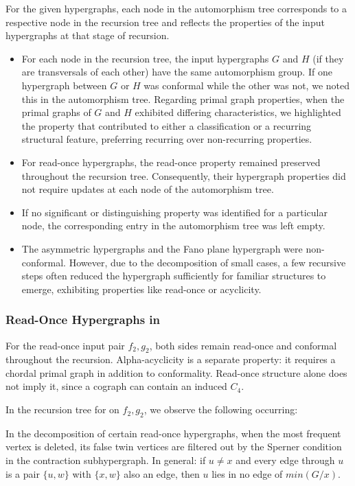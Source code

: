 For the given hypergraphs, each node in the automorphism tree corresponds to a respective node in the \FKA{} recursion tree and reflects the properties of the input hypergraphs at that stage of recursion.
\begin{itemize}
\item For each node in the \FKA{} recursion tree, the input hypergraphs $G$ and $H$ (if they are transversals of each other) have the same automorphism group. If one hypergraph between $G$ or $H$ was conformal while the other was not, we noted this in the automorphism tree. Regarding primal graph properties, when the primal graphs of $G$ and $H$ exhibited differing characteristics, we highlighted the property that contributed to either a classification or a recurring structural feature, preferring recurring over non-recurring properties.
\item For read-once hypergraphs, the read-once property remained preserved throughout the recursion tree. Consequently, their hypergraph properties did not require updates at each node of the automorphism tree.
\item If no significant or distinguishing property was identified for a particular node, the corresponding entry in the automorphism tree was left empty.
\item The asymmetric hypergraphs and the Fano plane hypergraph were non-conformal. However, due to the decomposition of small cases, a few recursive steps often reduced the hypergraph sufficiently for familiar structures to emerge, exhibiting properties like read-once or acyclicity.
\end{itemize}

\subsubsection*{Read-Once Hypergraphs in \FKA}

For the read-once input pair $f_2,g_2$, both sides remain read-once and
conformal throughout the recursion. Alpha-acyclicity is a separate property:
it requires a chordal primal graph in addition to conformality. Read-once
structure alone does not imply it, since a cograph can contain an induced $C_4$.

In the recursion tree for \FKA{} on $f_2,g_2$, we observe the following occurring:

\begin{observation}\label{obs:false-twins}
In the \FKA{} decomposition of certain read-once hypergraphs, when the most frequent vertex is deleted, its false twin vertices are filtered out by the Sperner condition in the contraction subhypergraph. In general: if $u\ne x$ and every edge through $u$ is a pair $\{u,w\}$ with $\{x,w\}$ also an edge, then $u$ lies in no edge of $min(G/x)$.
\end{observation}

